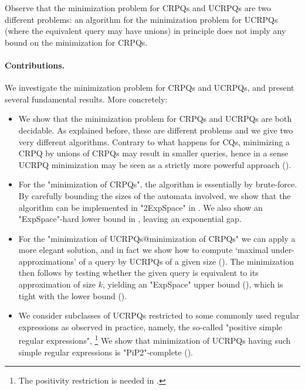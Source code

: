 Observe that the minimization problem for CRPQs and UCRPQs are two different problems: an algorithm for the minimization problem for UCRPQs (where the equivalent query may have unions) in principle does not imply any bound on the minimization for CRPQs.

\paragraph{Contributions.}
We investigate the minimization problem for CRPQs and UCRPQs, and present several fundamental results. More concretely:
\begin{itemize}
	\item We show that the minimization problem for CRPQs and UCRPQs are both decidable. As explained before, these are different problems  and we give two very different algorithms. Contrary to what happens for CQs, minimizing a CRPQ by unions of CRPQs may result in smaller queries, hence in a sense UCRPQ minimization may be seen as a strictly more powerful approach ().
	\item For the "minimization of CRPQs", the algorithm is essentially by brute-force. By carefully bounding the sizes of the automata involved, we show that the algorithm can be implemented in "2ExpSpace" in . We also show an "ExpSpace"-hard lower bound in , leaving an exponential gap.
	\item For the "minimization of UCRPQs@minimization of CRPQs" we can apply a more elegant solution, and in fact we show how to compute `maximal under-approximations' of a query by UCRPQs of a given size (). The minimization then follows by testing whether the given query is equivalent to its approximation of size $k$, yielding an "ExpSpace" upper bound (), which is tight with the lower bound ().
	\item We consider subclasses of UCRPQs restricted to some commonly used regular expressions as observed in practice, namely, the so-called "positive simple regular expressions",%
	\footnote{The positivity restriction is needed in .}
	We show that minimization of UCRPQs having such simple regular expressions is
	"PiP2"-complete (). %

\end{itemize}
